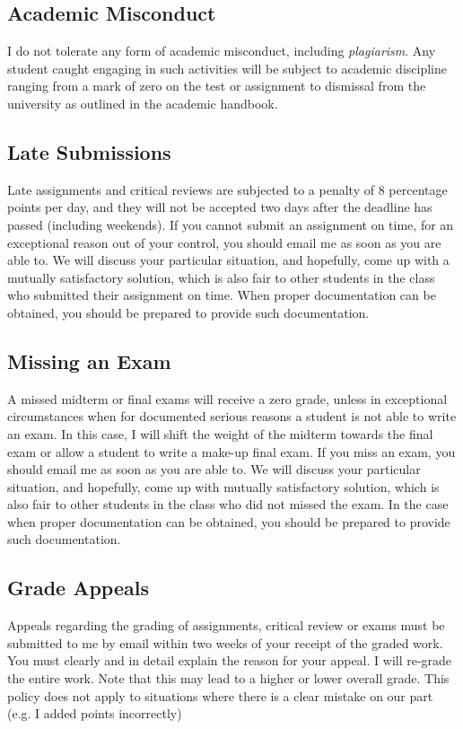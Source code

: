 \documentclass[letterpaper,12pt]{article}
\theoremstyle{dotlessS}
\begin{document}
\subsection*{Academic Misconduct}
I do not tolerate any form of academic misconduct, including \textit{plagiarism}. Any student caught engaging in such activities will be subject to academic discipline ranging from a mark of zero on the test or assignment to dismissal from the university as outlined in the academic handbook.

\subsection*{Late Submissions}
Late assignments and critical reviews are subjected to a penalty of $8$ percentage points per day, and they will not be accepted two days after the deadline has passed (including weekends). If you cannot submit an assignment on time, for an exceptional reason out of your control, you should email me as soon as you are able to. We will discuss your particular situation, and hopefully, come up with a mutually satisfactory solution, which is also fair to other students in the class who submitted their assignment on time. When proper documentation can be obtained, you should be prepared to provide such documentation.    


\subsection*{Missing an Exam}
A missed midterm or final exams will receive a zero grade, unless in exceptional circumstances when for documented serious reasons a student is not able to write an exam. In this case, I will shift the weight of the midterm towards the final exam or allow a student to write a make-up final exam. If you miss an exam, you should email me as soon as you are able to. We will discuss your particular situation, and hopefully, come up with mutually satisfactory solution, which is also fair to other students in the class who did not missed the exam. In the case when proper documentation can be obtained, you should be prepared to provide such documentation. 

\subsection*{Grade Appeals}
Appeals regarding the grading of assignments, critical review or exams must be submitted to me by email within two weeks of your receipt of the graded work. You must clearly and in detail explain the reason for your appeal. I will re-grade the entire work. Note that this may lead to a higher or lower overall grade. This policy does not apply to situations where there is a clear mistake on our part (e.g. I added points incorrectly)
\end{document}
